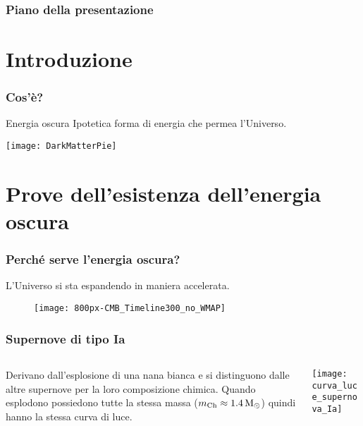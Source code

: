 \begin{frame}
  \maketitle
\end{frame}

\begin{frame}
  \frametitle{Piano della presentazione}
  \tableofcontents
\end{frame}

\section{Introduzione}

\begin{frame}
  \frametitle{Cos'è?}
  \begin{block}{Energia oscura}
    Ipotetica forma di energia che permea l'Universo.
  \end{block}
  \texttt{[image: DarkMatterPie]}
\end{frame}

\section[Prove dell'esistenza]{Prove dell'esistenza dell'energia oscura}

\begin{frame}
  \frametitle{Perché serve l'energia oscura?}
  L'Universo si sta espandendo in maniera \alert{accelerata}.
  \begin{figure}
    \centering
    \texttt{[image: 800px-CMB\_Timeline300\_no\_WMAP]}
  \end{figure}
\end{frame}

\begin{frame}
  \frametitle{Supernove di tipo Ia}
  \begin{columns}
    \begin{column}{0.35\textwidth}
      Derivano dall'esplosione di una nana bianca e si distinguono dalle altre
      supernove per la loro composizione chimica. Quando esplodono possiedono
      tutte la stessa massa
      ($m_{\textup{Ch}} \approx \SI{1.4}{\ensuremath{M_\odot}}$) quindi hanno
      la stessa curva di luce.
    \end{column}
    \begin{column}{0.6\textwidth}
      \texttt{[image: curva\_luce\_supernova\_Ia]}
    \end{column}
  \end{columns}
\end{frame}

